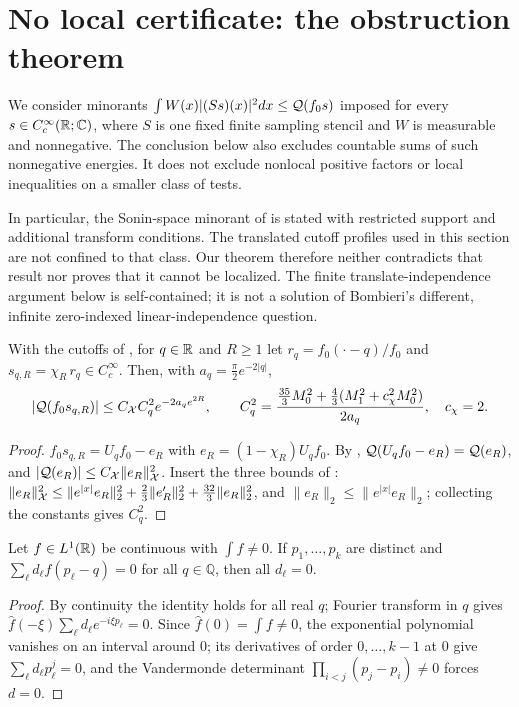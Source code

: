 \section{No local certificate: the obstruction theorem}\label{sec:obstruction}

We consider minorants
$\int W(x)|(Ss)(x)|^2dx\le\mathcal Q(f_0s)$ imposed for every
$s\in C_c^\infty(\mathbb R;\mathbb C)$, where $S$ is one fixed finite sampling
stencil and $W$ is measurable and nonnegative. The conclusion below
also excludes countable sums of such nonnegative energies.
It does not exclude nonlocal positive factors or local inequalities
on a smaller class of tests.

In particular, the Sonin-space minorant of
\cite[Theorem 7.1]{Connes2026} is stated with restricted support and
additional transform conditions. The translated cutoff profiles used
in this section are not confined to that class. Our theorem therefore
neither contradicts that result nor proves that it cannot be localized.
The finite translate-independence argument below is self-contained;
it is not a solution of Bombieri's different, infinite zero-indexed
linear-independence question.

\begin{lemma}\label{lem:budget}
With the cutoffs of , for $q\in\mathbb R$ and $R\ge1$ let $r_q=f_0(\cdot-q)/f_0$ and $s_{q,R}=\chi_R\,r_q\in C_c^\infty$. Then,
with $a_q=\frac\pi2e^{-2|q|}$,
\begin{equation}\label{eq:budget}
 |\mathcal Q(f_0s_{q,R})|
 \le C_{\mathcal X}C_q^2e^{-2a_qe^{2R}},\qquad
 C_q^2=
 \frac{\frac{35}{3}M_0^2+\frac43(M_1^2+c_\chi^2M_0^2)}{2a_q},
 \quad c_\chi=2.
\end{equation}
\end{lemma}
\begin{proof}
$f_0s_{q,R}=U_qf_0-e_R$ with $e_R=(1-\chi_R)U_qf_0$. By , $\mathcal Q(U_qf_0-e_R)=\mathcal Q(e_R)$, and
$|\mathcal Q(e_R)|\le C_{\mathcal X}\|e_R\|_{\mathcal X}^2$. Insert the three bounds of : $\|e_R\|_{\mathcal X}^2\le\|e^{|x|}e_R\|_2^2+\frac23\|e_R'\|_2^2+\frac{32}3\|e_R\|_2^2$,
and $\|e_R\|_2\le\|e^{|x|}e_R\|_2$; collecting the constants gives $C_q^2$.
\end{proof}

\begin{lemma}\label{lem:indep}
Let $f\in L^1(\mathbb R)$ be continuous with $\int f\ne0$. If $p_1,\dots,p_k$ are distinct and
$\sum_\ell d_\ell f(p_\ell-q)=0$ for all $q\in\mathbb Q$, then all $d_\ell=0$.
\end{lemma}
\begin{proof}
By continuity the identity holds for all real $q$; Fourier transform in $q$ gives $\widehat f(-\xi)\sum_\ell d_\ell e^{-i\xi p_\ell}=0$.
Since $\widehat f(0)=\int f\ne0$, the exponential polynomial vanishes on an interval around $0$; its derivatives of order
$0,\dots,k-1$ at $0$ give $\sum_\ell d_\ell p_\ell^j=0$, and the Vandermonde determinant $\prod_{i<j}(p_j-p_i)\ne0$ forces $d=0$.
\end{proof}


